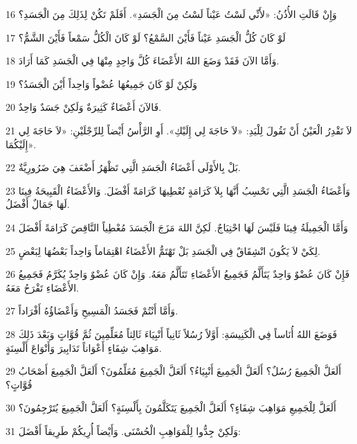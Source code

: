 \par 16 وَإِنْ قَالَتِ الأُذُنُ: «لأَنِّي لَسْتُ عَيْناً لَسْتُ مِنَ الْجَسَدِ». أَفَلَمْ تَكُنْ لِذَلِكَ مِنَ الْجَسَدِ؟
\par 17 لَوْ كَانَ كُلُّ الْجَسَدِ عَيْناً فَأَيْنَ السَّمْعُ؟ لَوْ كَانَ الْكُلُّ سَمْعاً فَأَيْنَ الشَّمُّ؟
\par 18 وَأَمَّا الآنَ فَقَدْ وَضَعَ اللهُ الأَعْضَاءَ كُلَّ وَاحِدٍ مِنْهَا فِي الْجَسَدِ كَمَا أَرَادَ.
\par 19 وَلَكِنْ لَوْ كَانَ جَمِيعُهَا عُضْواً وَاحِداً أَيْنَ الْجَسَدُ؟
\par 20 فَالآنَ أَعْضَاءٌ كَثِيرَةٌ وَلَكِنْ جَسَدٌ وَاحِدٌ.
\par 21 لاَ تَقْدِرُ الْعَيْنُ أَنْ تَقُولَ لِلْيَدِ: «لاَ حَاجَةَ لِي إِلَيْكِ». أَوِ الرَّأْسُ أَيْضاً لِلرِّجْلَيْنِ: «لاَ حَاجَةَ لِي إِلَيْكُمَا».
\par 22 بَلْ بِالأَوْلَى أَعْضَاءُ الْجَسَدِ الَّتِي تَظْهَرُ أَضْعَفَ هِيَ ضَرُورِيَّةٌ.
\par 23 وَأَعْضَاءُ الْجَسَدِ الَّتِي نَحْسِبُ أَنَّهَا بِلاَ كَرَامَةٍ نُعْطِيهَا كَرَامَةً أَفْضَلَ. وَالأَعْضَاءُ الْقَبِيحَةُ فِينَا لَهَا جَمَالٌ أَفْضَلُ.
\par 24 وَأَمَّا الْجَمِيلَةُ فِينَا فَلَيْسَ لَهَا احْتِيَاجٌ. لَكِنَّ اللهَ مَزَجَ الْجَسَدَ مُعْطِياً النَّاقِصَ كَرَامَةً أَفْضَلَ
\par 25 لِكَيْ لاَ يَكُونَ انْشِقَاقٌ فِي الْجَسَدِ بَلْ تَهْتَمُّ الأَعْضَاءُ اهْتِمَاماً وَاحِداً بَعْضُهَا لِبَعْضٍ.
\par 26 فَإِنْ كَانَ عُضْوٌ وَاحِدٌ يَتَأَلَّمُ فَجَمِيعُ الأَعْضَاءِ تَتَأَلَّمُ مَعَهُ. وَإِنْ كَانَ عُضْوٌ وَاحِدٌ يُكَرَّمُ فَجَمِيعُ الأَعْضَاءِ تَفْرَحُ مَعَهُ.
\par 27 وَأَمَّا أَنْتُمْ فَجَسَدُ الْمَسِيحِ وَأَعْضَاؤُهُ أَفْرَاداً.
\par 28 فَوَضَعَ اللهُ أُنَاساً فِي الْكَنِيسَةِ: أَوَّلاً رُسُلاً ثَانِياً أَنْبِيَاءَ ثَالِثاً مُعَلِّمِينَ ثُمَّ قُوَّاتٍ وَبَعْدَ ذَلِكَ مَوَاهِبَ شِفَاءٍ أَعْوَاناً تَدَابِيرَ وَأَنْوَاعَ أَلْسِنَةٍ.
\par 29 أَلَعَلَّ الْجَمِيعَ رُسُلٌ؟ أَلَعَلَّ الْجَمِيعَ أَنْبِيَاءُ؟ أَلَعَلَّ الْجَمِيعَ مُعَلِّمُونَ؟ أَلَعَلَّ الْجَمِيعَ أَصْحَابُ قُوَّاتٍ؟
\par 30 أَلَعَلَّ لِلْجَمِيعِ مَوَاهِبَ شِفَاءٍ؟ أَلَعَلَّ الْجَمِيعَ يَتَكَلَّمُونَ بِأَلْسِنَةٍ؟ أَلَعَلَّ الْجَمِيعَ يُتَرْجِمُونَ؟
\par 31 وَلَكِنْ جِدُّوا لِلْمَوَاهِبِ الْحُسْنَى. وَأَيْضاً أُرِيكُمْ طَرِيقاً أَفْضَلَ:

